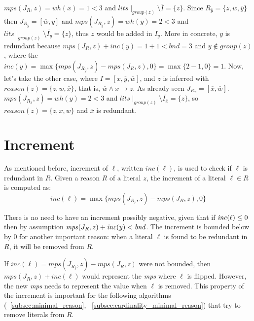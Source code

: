 $mps(J_R,z) = \mathit{wh}(x) = 1 < 3$ and $lits\mid_{group(z)} \setminus \overline{I} = \{z\}$.
Since $R_{\overline{y}} = \{z, w, \overline{y}\}$ then $J_{R_{\overline{y}}} = [\overline{w},y]$ and 
$mps(J_{R_{\overline{y}}},z) = \mathit{wh}(y) = 2 < 3$ and
$lits\mid_{group(z)} \setminus \overline{I_y} = \{z\}$, thus $z$ would be added in $I_y$.
More in concrete, $y$ is redundant because $mps(J_R,z) + \mathit{inc}(y) = 1 + 1 < \mathit{bnd} = 3$ and
$y \not\in group(z)$, where the $\mathit{inc}(y) = \max\{mps(J_{R_{\overline{y}}},z) - mps(J_R,z),0\} = \max\{2 - 1,0\} = 1$.
Now, let's take the other case, where $I = [x, \overline{y}, \overline{w}]$, 
and $z$ is inferred with $\mathit{reason}(z) = \{z, w, \overline{x}\}$, that is, 
$\overline{w} \land  x \rightarrow z$.
As already seen $J_{R_{x}}=[\overline{x}, \overline{w}]$.\\
$mps(J_{R_{x}},z) = \mathit{wh}(y) = 2 < 3$ and
$lits\mid_{group(z)} \setminus \overline{I_{\overline{x}}} = \{z\}$, 
so $\mathit{reason}(z)=\{z, x, w\}$
and $\overline{x}$ is redundant.

\section{Increment}
\label{sec:increment}

As mentioned before, increment of $\ell$, written $\mathit{inc}(\ell)$, is used to check 
if $\ell$ is redundant in $R$.
Given a reason $R$ of a literal $z$, the increment of a literal $\ell \in R$ is computed as:
$$\mathit{inc}(\ell) = \max\{mps(J_{R_{\overline{\ell}}},z) - mps(J_R,z),0\}$$

There is no need to have an increment possibly negative, given that if $\mathit{inc}(\ell) \le 0$
then by assumption $\mathit{mps}(J_R,z) + \mathit{inc}(y) < \mathit{bnd}$.
The increment is bounded below by 0 for another important reason: 
when a literal \(\ell\) is found to be redundant in \(R\), it will be removed from \(R\).

If \(\mathit{inc}(\ell) = \mathit{mps}(J_{R_{\overline{\ell}}}, z) - \mathit{mps}(J_R, z)\) were not bounded, 
then \(\mathit{mps}(J_R, z) + \mathit{inc}(\ell)\) would represent the \textit{mps} where \(\ell\) is flipped.
However, the new \textit{mps} needs to represent the value when \(\ell\) is removed.
This property of the increment is important for the following algorithms (~\ref{subsec:minimal_reason},
~\ref{subsec:cardinality_minimal_reason}) that try
to remove literals from \(R\).


